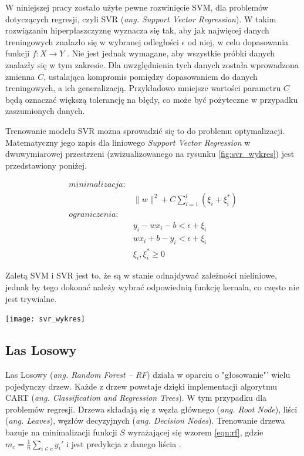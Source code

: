 W niniejszej pracy zostało użyte pewne rozwinięcie SVM, dla problemów dotyczących regresji, czyli SVR ({\em ang. Support Vector Regression}).  W takim rozwiązaniu hiperpłaszczyznę wyznacza się tak, aby jak najwięcej danych treningowych znalazło się w wybranej odległości $\epsilon$ od niej, w celu dopasowania funkcji $f \colon X \to Y$ \cite{svr}. Nie jest jednak wymagane, aby wszystkie próbki danych znalazły się  w tym zakresie. Dla uwzględnienia tych danych została wprowadzona zmienna $C$, ustalająca kompromis pomiędzy dopasowaniem do danych treningowych, a ich generalizacją. Przykładowo mniejsze wartości parametru $C$ będą oznaczać większą tolerancję na błędy, co może  być pożyteczne w przypadku zaszumionych danych. 

Trenowanie modelu SVR można sprowadzić się to do problemu optymalizacji. Matematyczny jego zapis dla liniowego \emph{Support Vector Regression} w dwuwymiarowej przestrzeni (zwizualizowanego na rysunku \ref{fig:svr_wykres}) jest przedstawiony poniżej. 

\begin{equation*}
\begin{aligned}
\mathit{minimalizacja:} \\&\parallel w \parallel^{2} +C\sum_{i=1}^{l} (\xi_{i} + \xi_{i}^{*}) \\
\mathit{ograniczenia:} \\ 
&y_{i} -  wx_{i} -b < \epsilon +\xi_{i} 
\\&  wx_{i} + b -y_{i} < \epsilon +\xi_{i}
\\&\xi_{i},\xi_{i}^{*}\geq 0
\end{aligned}
\label{eqn:svr}
\end{equation*}

Zaletą SVM i SVR jest to, że są w stanie odnajdywać zależności nieliniowe, jednak by tego dokonać należy wybrać odpowiednią funkcję kernala, co często nie jest trywialne.

\begin{center}
	\texttt{[image: svr\_wykres]}
	\label{fig:svr_wykres}
	\label{fig:xccs}
\end{center}

\subsection{Las Losowy}
Las Losowy (\emph{ang. Random Forest -- RF}) działa w oparciu o "głosowanie"' wielu pojedynczy drzew. Każde z drzew powstaje dzięki implementacji algorytmu CART ({\em ang. Classification and Regression Trees}). W tym przypadku dla problemów regresji. Drzewa składają się z węzła głównego ({\em ang. Root Node}), liści ({\em ang. Leaves}), węzłów decyzyjnych ({\em ang. Decision Nodes}). Trenowanie drzewa bazuje na minimalizacji funkcji $S$ wyrażającej się wzorem \ref{eqn:rf}, gdzie $m_c=\frac{1}{n}\sum_{i \in c}y_i'$ i jest predykcja z danego liścia \cite{rf}. 

